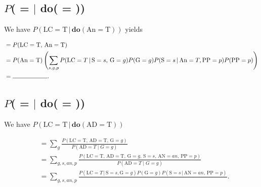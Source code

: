 \documentclass{article}
\begin{document}
\subsection{$P$( =  $\vert$ \textbf{do}( = ))}

We have $P(\text{LC} = \text{T} \,\vert\, \textbf{do}(\text{An} = \text{T}))$ yields

\begin{align*}
     &= P(\text{LC} = \text{T},\, \text{An} = \text{T}) \\
        &= P(\text{An} = \text{T})\left(\sum_{s, g, p}P(\text{LC} = T \,|\, \text{S} = s,\, \text{G} = g)P(\text{G} = g)P(\text{S}=s\,|\, \text{An} = T, \text{PP} = p)P(\text{PP} = p)\right) \\
    &= \rule{2cm}{0.15mm}.
\end{align*}

\subsection{$P$( =  $\vert$ \textbf{do}( = ))}

We have $P(\text{LC} = \text{T} \,\vert\, \textbf{do}(\text{AD} = \text{T}))$

\begin{align*}
     &= \sum_{g} \frac{P(\text{LC} = \text{T},\, \text{AD} = \text{T},\, \text{G}=g)}{P(\text{AD} = T\;|\; G=g)} \\
     &= \sum_{g, s, an,  p} \frac{P(\text{LC} = \text{T},\, \text{AD} = \text{T},\, \text{G}=g,\, \text{S} = s,\, \text{AN} = an,\, \text{PP} = p)}{P(\text{AD} = T\;|\; G=g)} \\
    &= \sum_{g,s,an,p}\frac{P(\text{LC}=T\,|\,\text{S}=s, \text{G}=g)P(\text{G}=g)P(\text{S}=s\,|\,\text{AN}=an,\,\text{PP}=p)}{}.
\end{align*}
\end{document}

